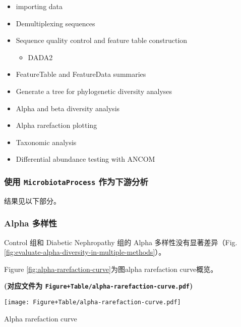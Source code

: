 \documentclass[
]{article}
\providecommand{\tightlist}{%
  \setlength{\itemsep}{0pt}\setlength{\parskip}{0pt}}
\begin{document}
\begin{itemize}
\tightlist
\item
  importing data
\item
  Demultiplexing sequences
\item
  Sequence quality control and feature table construction

  \begin{itemize}
  \tightlist
  \item
    DADA2
  \end{itemize}
\item
  FeatureTable and FeatureData summaries
\item
  Generate a tree for phylogenetic diversity analyses
\item
  Alpha and beta diversity analysis
\item
  Alpha rarefaction plotting
\item
  Taxonomic analysis
\item
  Differential abundance testing with ANCOM
\end{itemize}

\hypertarget{ux4f7fux7528-microbiotaprocess-ux4f5cux4e3aux4e0bux6e38ux5206ux6790}{%
\subsubsection{\texorpdfstring{使用 \texttt{MicrobiotaProcess} 作为下游分析}{使用 MicrobiotaProcess 作为下游分析}}\label{ux4f7fux7528-microbiotaprocess-ux4f5cux4e3aux4e0bux6e38ux5206ux6790}}

结果见以下部分。

\hypertarget{alpha-ux591aux6837ux6027}{%
\subsubsection{Alpha 多样性}\label{alpha-ux591aux6837ux6027}}

Control 组和 Diabetic Nephropathy 组的 Alpha 多样性没有显著差异（Fig. \ref{fig:evaluate-alpha-diversity-in-multiple-methods}）。

Figure \ref{fig:alpha-rarefaction-curve}为图alpha rarefaction curve概览。

\textbf{(对应文件为 \texttt{Figure+Table/alpha-rarefaction-curve.pdf})}

\def\@captype{figure}
\begin{center}
\texttt{[image: Figure+Table/alpha-rarefaction-curve.pdf]}
\caption{Alpha rarefaction curve}\label{fig:alpha-rarefaction-curve}
\end{center}
\end{document}
